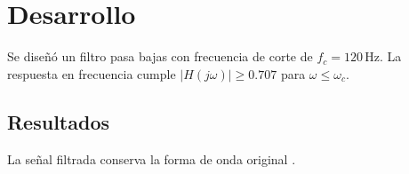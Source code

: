 \section{Desarrollo}
Se diseñó un filtro pasa bajas con frecuencia de corte de $f_c = 120\,\mathrm{Hz}$.
La respuesta en frecuencia cumple $|H(j\omega)| \geq 0.707$ para $\omega \leq \omega_c$.

\subsection{Resultados}
La señal filtrada conserva la forma de onda original \cite{ejemplo2026}.
